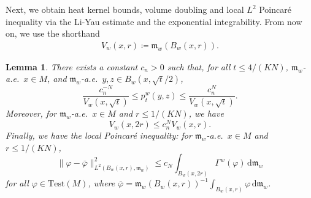 \documentclass[10pt]{article}
\newcommand{\m}{\mathfrak{m}}
\newcommand{\M}{{\mathit{M}}}
\renewcommand{\d}{\,\mathrm{d}}
\newcommand{\Test}{\mathrm{Test}}
\newcommand{\df}{\coloneqq}
\theoremstyle{plain}
\newtheorem{lemma}[theorem]{Lemma}
\theoremstyle{definition}
\begin{document}
Next, we obtain heat kernel bounds, volume doubling and local $L^2$ Poincaré inequality via the Li-Yau estimate and the exponential integrability. From now on, we use the shorthand 
\begin{align*}
V_w(x,r) \df \m_w(B_w(x,r)).    
\end{align*}


\begin{lemma}
    There exists a constant $c_n>0$ such that, for all $t\leq 4/(KN)$, $\m_w$-a.e.~$x\in M$, and $\m_w$-a.e.~$y,z\in B_w(x,\sqrt t/2)$,
    \[
    \frac{c_n^{-N}}{V_w(x,\sqrt{t})}
    \leq p_t^w(y,z)\leq \frac{c_n^{N}}{V_w(x,\sqrt{t})}.
    \]
    Moreover, for $\m_w$-a.e.~$x\in \M$ and $r\leq 1/(KN)$, we have 
    \[
    V_w(x,2r)\leq c_n^{N}V_w(x,r).
    \]
    Finally, we have the local Poincar\'e inequality: for $\m_w$-a.e.~$x\in \M$ and $r\leq 1/(KN)$, 
    \[
    \|\varphi-\bar\varphi\|_{L^2(B_w(x,r),\m_w)}^2\leq c_N\int_{B_w(x,2r)}\Gamma^w(\varphi)\d\m_w
    \]
    for all $\varphi\in\Test(\M)$, where $\bar\varphi=\m_w(B_w(x,r))^{-1}\int_{B_w(x,r)}\varphi\d\m_w$.
\end{lemma}
\end{document}
